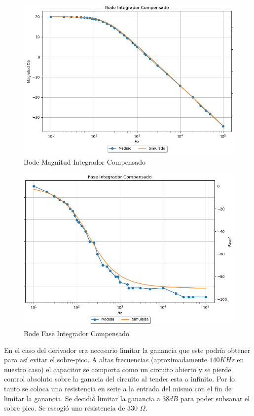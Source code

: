 \documentclass[a4paper]{article}
\begin{document}
\begin{figure}[H]
	\centering
	\includegraphics[width=\textwidth]{Ejercicio4/SUPERPOSICION-INTEGRADOR-COMPENSADO} 
	\caption{Bode Magnitud Integrador Compensado}
\end{figure}

\begin{figure}[H]
	\centering
	\includegraphics[width=\textwidth]{Ejercicio4/SUPERPOSICION-FASE-INTEGRADOR-COMPENSADO} 
	\caption{Bode Fase Integrador Compensado}
\end{figure}

En el caso del derivador era necesario limitar la ganancia que este podría obtener para así evitar el sobre-pico. A altas frecuencias (aproximadamente $140KHz$ en nuestro caso) el capacitor se comporta como un circuito abierto y se pierde control absoluto sobre la ganacia del circuito al tender esta a infinito. Por lo tanto se coloca una resistencia en serie a la entrada del mismo con el fin de limitar la ganancia.
Se decidió limitar la ganancia a 38$dB$ para poder subsanar el sobre pico. Se escogió una resistencia de 330 $\Omega$.
\end{document}
